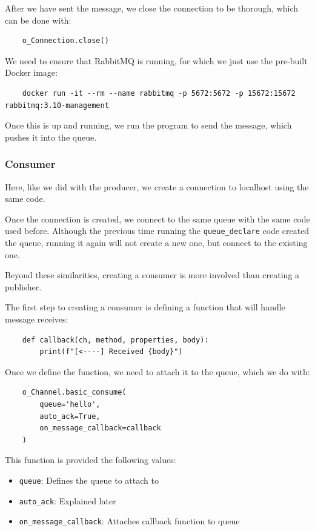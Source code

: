 \documentclass{article}
\begin{document}
After we have sent the message, we close the connection to be thorough, which can be done with:

\begin{verbatim}
    o_Connection.close()
\end{verbatim}

We need to ensure that RabbitMQ is running, for which we just use the pre-built Docker image:

\begin{verbatim}
    docker run -it --rm --name rabbitmq -p 5672:5672 -p 15672:15672 rabbitmq:3.10-management
\end{verbatim}

Once this is up and running, we run the program to send the message, which pushes it into the queue.

\subsubsection{Consumer}

Here, like we did with the producer, we create a connection to localhost using the same code.

Once the connection is created, we connect to the same queue with the same code used before. Although the previous time running the \verb|queue_declare| code created the queue, running it again will not create a new one, but connect to the existing one.

Beyond these similarities, creating a consumer is more involved than creating a publisher. 

The first step to creating a consumer is defining a function that will handle message receives:

\begin{verbatim}
    def callback(ch, method, properties, body):
        print(f"[<----] Received {body}")
\end{verbatim}

Once we define the function, we need to attach it to the queue, which we do with:

\begin{verbatim}
    o_Channel.basic_consume(
        queue='hello',
        auto_ack=True,
        on_message_callback=callback
    )
\end{verbatim}

This function is provided the following values:

\begin{itemize}
    \item \verb|queue|: Defines the queue to attach to
    \item \verb|auto_ack|: Explained later
    \item \verb|on_message_callback|: Attaches callback function to queue
\end{itemize}
\end{document}
